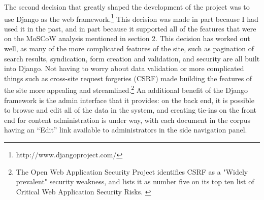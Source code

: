 The second decision that greatly shaped the development of the project was to use Django as the web framework.\footnote{http://www.djangoproject.com/} This decision was made in part because I had used it in the past, and in part because it supported all of the features that were on the MoSCoW analysis mentioned in section 2. This decision has worked out well, as many of the more complicated features of the site, such as pagination of search results, syndication, form creation and validation, and security are all built into Django. Not having to worry about data validation or more complicated things such as cross-site request forgeries (CSRF) made building the features of the site more appealing and streamlined.\footnote{The Open Web Application Security Project identifies CSRF as a "Widely prevalent" security weakness, and lists it as number five on its top ten list of Critical Web Application Security Risks. \cite{open_web_application_security_project_owasp_2010}} An additional benefit of the Django framework is the admin interface that it provides: on the back end, it is possible to browse and edit all of the data in the system, and creating tie-ins on the front end for content administration is under way, with each document in the corpus having an ``Edit'' link available to administrators in the side navigation panel.

